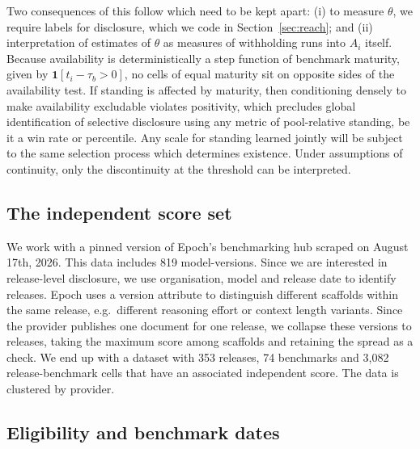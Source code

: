 Two consequences of this follow which need to be kept apart: (i) to measure $\theta$, we require labels for disclosure, which we code in Section~\ref{sec:reach}; and (ii) interpretation of estimates of $\theta$ as measures of withholding runs into $A_i$ itself. Because availability is deterministically a step function of benchmark maturity, given by $\mathbf{1}[t_i - \tau_b > 0]$, no cells of equal maturity sit on opposite sides of the availability test. If standing is affected by maturity, then conditioning densely to make availability excludable violates positivity, which precludes global identification of selective disclosure using any metric of pool-relative standing, be it a win rate or percentile. Any scale for standing learned jointly will be subject to the same selection process which determines existence. Under assumptions of continuity, only the discontinuity at the threshold can be interpreted.

\subsection{The independent score set}\label{sec:data-scores}

We work with a pinned version of Epoch's benchmarking hub scraped on August 17th, 2026. This data includes 819 model-versions. Since we are interested in release-level disclosure, we use organisation, model and release date to identify releases. Epoch uses a version attribute to distinguish different scaffolds within the same release, e.g.\ different reasoning effort or context length variants. Since the provider publishes one document for one release, we collapse these versions to releases, taking the maximum score among scaffolds and retaining the spread as a check. We end up with a dataset with 353 releases, 74 benchmarks and 3,082 release-benchmark cells that have an associated independent score. The data is clustered by provider.

\subsection{Eligibility and benchmark dates}\label{sec:data-gate}

